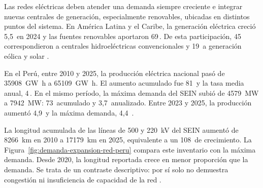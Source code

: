 Las redes eléctricas deben atender una demanda siempre creciente e integrar nuevas centrales de generación, especialmente renovables, ubicadas en distintos puntos del sistema. En América Latina y el Caribe, la generación eléctrica creció 5,5\,\pct{} en 2024 y las fuentes renovables aportaron 69\,\pct{}. De esta participación, 45\,\pct{} correspondieron a centrales hidroeléctricas convencionales y 19\,\pct{} a generación eólica y solar \parencite{olade2025generacionALC2024}.

En el Perú, entre 2010 y 2025, la producción eléctrica nacional pasó de \SI{35908}{\giga\watt\hour} a \SI{65109}{\giga\watt\hour}. El aumento acumulado fue 81\,\pct{} y la tasa media anual, 4\,\pct{}. En el mismo período, la máxima demanda del SEIN subió de \SI{4579}{\mega\watt} a \SI{7942}{\mega\watt}: 73\,\pct{} acumulado y 3,7\,\pct{} anualizado. Entre 2023 y 2025, la producción aumentó 4,9\,\pct{} y la máxima demanda, 4,4\,\pct{} \parencites[sec.~10.4]{minem2025anuario2024}[cuadro~4]{minem2025indicadoresDiciembre}{coesMaximaDemanda}.

La longitud acumulada de las líneas de 500 y \SI{220}{\kilo\volt} del SEIN aumentó de \SI{8266}{\kilo\metre} en 2010 a \SI{17179}{\kilo\metre} en 2025, equivalente a un 108\,\pct{} de crecimiento. La Figura~\ref{fig:demanda-expansion-red-peru} compara este inventario con la máxima demanda. Desde 2020, la longitud reportada crece en menor proporción que la demanda. Se trata de un contraste descriptivo: por sí solo no demuestra congestión ni insuficiencia de capacidad de la red \parencites{coesEstadisticasAnuales}{coesMaximaDemanda}.

